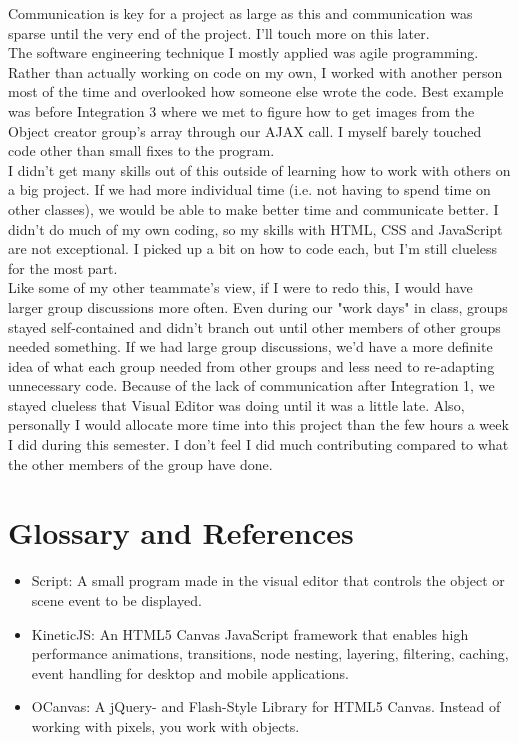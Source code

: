 \documentclass[12pt]{article}
\begin{document}
Communication is key for a project as large as this and communication was sparse until the very end of the project.  I'll touch more on this later.  \\

The software engineering technique I mostly applied was agile programming.  Rather than actually working on code on my own, I worked with another person most of the time and overlooked how someone else wrote the code.  Best example was before Integration 3 where we met to figure how to get images from the Object creator group's array through our AJAX call.  I myself barely touched code other than small fixes to the program. \\

I didn't get many skills out of this outside of learning how to work with others on a big project.  If we had more individual time (i.e. not having to spend time on other classes), we would be able to make better time and communicate better.  I didn't do much of my own coding, so my skills with HTML, CSS and JavaScript are not exceptional.  I picked up a bit on how to code each, but I'm still clueless for the most part. \\

Like some of my other teammate's view, if I were to redo this, I would have larger group discussions more often.  Even during our "work days" in class, groups stayed self-contained and didn't branch out until other members of other groups needed something.  If we had large group discussions, we'd have a more definite idea of what each group needed from other groups and less need to re-adapting unnecessary code.  Because of the lack of communication after Integration 1, we stayed clueless that Visual Editor was doing until it was a little late.  Also, personally I would allocate more time into this project than the few hours a week I did during this semester.  I don't feel I did much contributing compared to what the other members of the group have done. \\

\section{Glossary and References}

\begin{itemize}
\item Script:  A small program made in the visual editor that controls the object or scene event to be displayed.
\item KineticJS:  An HTML5 Canvas JavaScript framework that enables high performance animations, transitions, node nesting, layering, filtering, caching, event handling for desktop and mobile applications.
\item OCanvas:  A jQuery- and Flash-Style Library for HTML5 Canvas.  Instead of working with pixels, you work with objects.
\end{itemize}
\end{document}
